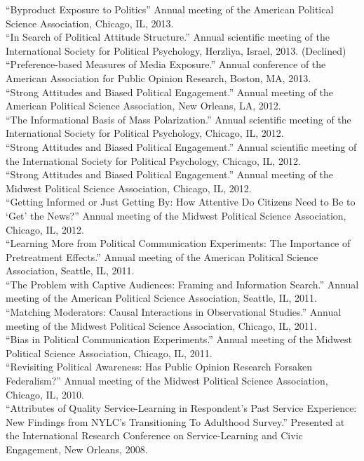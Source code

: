 \documentclass[12pt]{article}
\newcommand{\entry}[1]{\indent {\color{lg}\guillemotright}\hspace{2pt}#1\vspace{.25em}\\}
\begin{document}
\entry{``Byproduct Exposure to Politics'' Annual meeting of the American Political Science Association, Chicago, IL, 2013.}
\entry{``In Search of Political Attitude Structure.'' Annual scientific meeting of the International Society for Political Psychology, Herzliya, Israel, 2013. (Declined)}
\entry{``Preference-based Measures of Media Exposure.'' Annual conference of the American Association for Public Opinion Research, Boston, MA, 2013.}
\entry{``Strong Attitudes and Biased Political Engagement.'' Annual meeting of the American Political Science Association, New Orleans, LA, 2012.}
\entry{``The Informational Basis of Mass Polarization.'' Annual scientific meeting of the International Society for Political Psychology, Chicago, IL, 2012.}
\entry{``Strong Attitudes and Biased Political Engagement.'' Annual scientific meeting of the International Society for Political Psychology, Chicago, IL, 2012.}
\entry{``Strong Attitudes and Biased Political Engagement.'' Annual meeting of the Midwest Political Science Association, Chicago, IL, 2012.}
\entry{``Getting Informed or Just Getting By: How Attentive Do Citizens Need to Be to `Get' the News?'' Annual meeting of the Midwest Political Science Association, Chicago, IL, 2012.}
\entry{``Learning More from Political Communication Experiments: The Importance of Pretreatment Effects.'' Annual meeting of the American Political Science Association, Seattle, IL, 2011.}
\entry{``The Problem with Captive Audiences: Framing and Information Search.'' Annual meeting of the American Political Science Association, Seattle, IL, 2011.}
\entry{``Matching Moderators: Causal Interactions in Observational Studies.'' Annual meeting of the Midwest Political Science Association, Chicago, IL, 2011.}
\entry{``Bias in Political Communication Experiments.'' Annual meeting of the Midwest Political Science Association, Chicago, IL, 2011.}
\entry{``Revisiting Political Awareness: Has Public Opinion Research Forsaken Federalism?'' Annual meeting of the Midwest Political Science Association, Chicago, IL, 2010.}
\entry{``Attributes of Quality Service-Learning in Respondent's Past Service Experience: New Findings from NYLC's Transitioning To Adulthood Survey.'' Presented at the International Research Conference on Service-Learning and Civic Engagement, New Orleans, 2008.}
\end{document}
